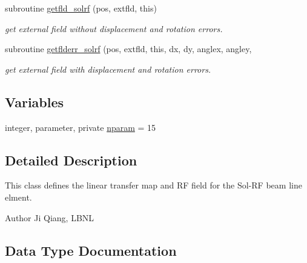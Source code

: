 \begin{DoxyCompactItemize}
\item 
subroutine \mbox{\hyperlink{namespacesolrfclass_a394f9bb9d3b50c8652a704f3c5af16ef}{getfld\+\_\+solrf}} (pos, extfld, this)
\begin{DoxyCompactList}\small\item\em get external field without displacement and rotation errors. \end{DoxyCompactList}\item 
subroutine \mbox{\hyperlink{namespacesolrfclass_a8a44826fce541cba8b4f7f5573ec7c98}{getflderr\+\_\+solrf}} (pos, extfld, this, dx, dy, anglex, angley,
\begin{DoxyCompactList}\small\item\em get external field with displacement and rotation errors. \end{DoxyCompactList}\end{DoxyCompactItemize}
\subsection*{Variables}
\begin{DoxyCompactItemize}
\item 
integer, parameter, private \mbox{\hyperlink{namespacesolrfclass_a01b965e25069cff9fb1797fbbcb9939d}{nparam}} = 15
\end{DoxyCompactItemize}


\subsection{Detailed Description}
This class defines the linear transfer map and RF field for the Sol-\/\+RF beam line elment. 

\begin{DoxyAuthor}{Author}
Ji Qiang, L\+B\+NL 
\end{DoxyAuthor}


\subsection{Data Type Documentation}
\label{structsolrfclass_1_1solrf}
